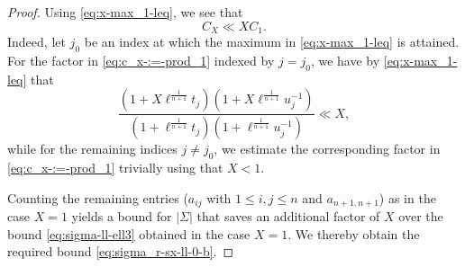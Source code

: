 \begin{proof}
  Using \eqref{eq:x-max_1-leq},  we see that
  \begin{equation}\label{eq:c_x-ll-x}
    C_X \ll X  C_1.
  \end{equation}
  Indeed, let $j_0$ be an index at which the maximum in \eqref{eq:x-max_1-leq} is attained.  For the factor in \eqref{eq:c_x-:=-prod_1} indexed by $j = j_0$, we have by \eqref{eq:x-max_1-leq} that
  \begin{equation*}
    \frac{
      (1 + X \ell^{\frac{1}{n+1}} t_j)  (1 + X \ell^{\frac{1}{n+1}} u_j^{-1})
    }{
      (1 + \ell^{\frac{1}{n+1}} t_j)  (1 + \ell^{\frac{1}{n+1}} u_j^{-1})
    }
    \ll X,
  \end{equation*}
  while for the remaining indices $j \neq j_0$, we estimate the corresponding factor in \eqref{eq:c_x-:=-prod_1} trivially using that $X < 1$.

  Counting the remaining entries ($a_{i j}$ with $1 \leq i, j \leq n$ and $a_{n+1,n+1}$) as in the case $X = 1$ yields a bound for $|\Sigma|$ that saves an additional factor of $X$ over the bound \eqref{eq:sigma-ll-ell3} obtained in the case $X = 1$.  We thereby obtain the required bound \eqref{eq:sigma_r-sx-ll-0-b}.
\end{proof}

